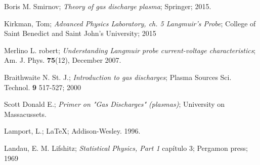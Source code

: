 \documentclass[letterpaper,12pt]{article}
\begin{document}
\begin{thebibliography}{99}

 Boris M. Smirnov; \textit{Theory of gas discharge plasma}; Springer; 2015.

 Kirkman, Tom; \textit{Advanced Physics Laboratory, ch. 5 Langmuir's Probe}; College of Saint Benedict and Saint John's University;  2015

  Merlino L. robert; \textit{Understanding Langmuir probe current-voltage characteristics}; Am. J. Phys. \textbf{75}(12), December 2007.

   Braithwaite N. St. J.; \textit{Introduction to gas discharges}; Plasma Sources Sci. Technol. \textbf{9} 517-527; 2000

 Scott Donald E.; \textit{Primer on "Gas Discharges" (plasmas)}; University on Massacussets.

 Lamport, L.; \LaTeX{}; Addison-Wesley. 1996.

 Landau, E. M. Lifshitz; \textit{Statistical Physics, Part 1} capítulo 3; Pergamon press; 1969
 
\end{thebibliography}
 \newpage
 
\end{document}
